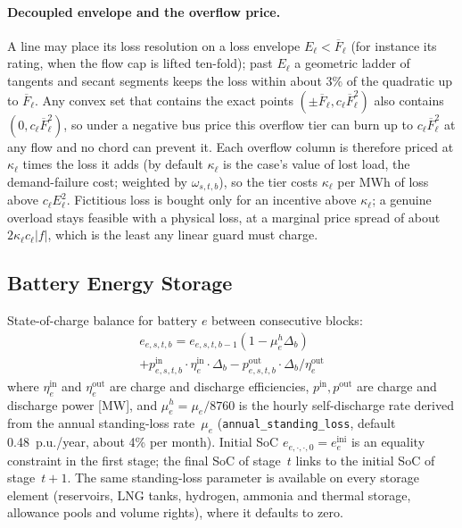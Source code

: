 \paragraph{Decoupled envelope and the overflow price.}
A line may place its loss resolution on a loss envelope
$E_\ell < \overline{F}_\ell$ (for instance its rating, when the flow cap
is lifted ten-fold); past $E_\ell$ a geometric ladder of tangents and
secant segments keeps the loss within about 3\% of the quadratic up to
$\overline{F}_\ell$.  Any convex set that contains the exact points
$(\pm\overline{F}_\ell, c_\ell \overline{F}_\ell^2)$ also contains
$(0, c_\ell \overline{F}_\ell^2)$, so under a negative bus price this
overflow tier can burn up to $c_\ell \overline{F}_\ell^2$ at any flow
and no chord can prevent it.  Each overflow column is therefore priced
at $\kappa_\ell$ times the loss it adds (by default
$\kappa_\ell$ is the case's value of lost load, the demand-failure cost;
weighted by $\omega_{s,t,b}$), so the tier
costs $\kappa_\ell$ per MWh of loss above $c_\ell E_\ell^2$.  Fictitious
loss is bought only for an incentive above $\kappa_\ell$; a genuine
overload stays feasible with a physical loss, at a marginal price spread
of about $2\kappa_\ell c_\ell |f|$, which is the least any linear guard
must charge.

\subsection{Battery Energy Storage}
\label{sec:battery}

State-of-charge balance for battery $e$ between consecutive blocks:
\begin{multline}
\label{eq:soc_balance}
e_{e,s,t,b} = e_{e,s,t,b-1}(1 - \mu_e^h \Delta_b) \\
  + p^\text{in}_{e,s,t,b} \cdot \eta^\text{in}_e \cdot \Delta_b
  - p^\text{out}_{e,s,t,b} \cdot \Delta_b / \eta^\text{out}_e
\end{multline}
where $\eta^\text{in}_e$ and $\eta^\text{out}_e$ are charge and discharge
efficiencies, $p^\text{in}, p^\text{out}$ are charge and discharge
power [MW], and $\mu_e^h = \mu_e / 8760$ is the hourly self-discharge
rate derived from the annual standing-loss rate~$\mu_e$
(\texttt{annual\_standing\_loss}, default 0.48~p.u./year, about 4\% per
month).
Initial SoC $e_{e,\cdot,\cdot,0} = e^\text{ini}_e$ is an
equality constraint in the first stage; the final SoC of stage~$t$
links to the initial SoC of stage~$t{+}1$.  The same standing-loss
parameter is available on every storage element (reservoirs, LNG
tanks, hydrogen, ammonia and thermal storage, allowance pools and
volume rights), where it defaults to zero.

